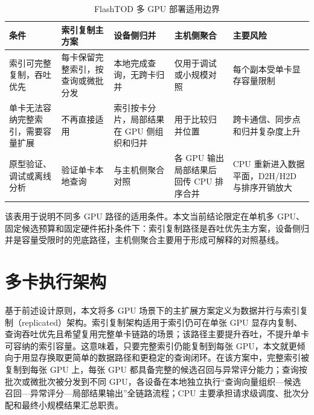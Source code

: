 \begin{table}[htbp]
  \caption{FlashTOD 多 GPU 部署适用边界}
  \label{tab:primary-vs-fallback}
  \centering
  \footnotesize
  \setlength{\tabcolsep}{2.6pt}
  \renewcommand{\arraystretch}{1.18}
  \begin{adjustbox}{max width=\linewidth}
    \begin{tabular}{P{2.4cm}P{3.1cm}P{3.2cm}P{3.0cm}P{2.8cm}}
      \toprule
      条件 & 索引复制主方案 & 设备侧归并 & 主机侧聚合 & 主要风险 \\
      \midrule
      索引可完整复制，吞吐优先 &
      每卡保留完整索引，按查询或微批分发 &
      本地完成查询，无跨卡归并 &
      仅用于调试或小规模对照 &
      每个副本受单卡显存容量限制 \\
      \midrule
      单卡无法容纳完整索引，需要容量扩展 &
      不再直接适用 &
      索引按卡分片，局部结果在 GPU 侧组织和归并 &
      用于比较归并位置 &
      跨卡通信、同步点和归并复杂度上升 \\
      \midrule
      原型验证、调试或离线分析 &
      验证单卡本地查询 &
      与主机侧聚合对照 &
      各 GPU 输出局部结果后回传 CPU 排序合并 &
      CPU 重新进入数据平面，D2H/H2D 与排序开销放大 \\
      \bottomrule
    \end{tabular}
  \end{adjustbox}
\end{table}

该表用于说明不同多 GPU 路径的适用条件。本文当前结论限定在单机多 GPU、固定候选预算和固定硬件拓扑条件下：索引复制路径是吞吐优先主方案，设备侧归并是容量受限时的兜底路径，主机侧聚合主要用于形成可解释的对照基线。

\section{多卡执行架构}

基于前述设计原则，本文将多 GPU 场景下的主扩展方案定义为数据并行与索引复制（replicated）架构。索引复制架构适用于索引仍可在单张 GPU 显存内复制、查询吞吐优先且希望复用完整单卡链路的场景；该路径主要提升吞吐，不提升单卡可容纳的索引容量。这意味着，只要完整索引仍能复制到每张 GPU，本文就更倾向于用显存换取更简单的数据路径和更稳定的查询闭环\citep{cuvs_multi_gpu_nn}。在该方案中，完整索引被复制到每张 GPU 上，每张 GPU 都具备完整的候选召回与异常评分能力；查询按批次或微批次被分发到不同 GPU，各设备在本地独立执行``查询向量组织---候选召回---异常评分---局部结果输出''全链路流程；CPU 主要承担请求级调度、批次分配和最终小规模结果汇总职责。

